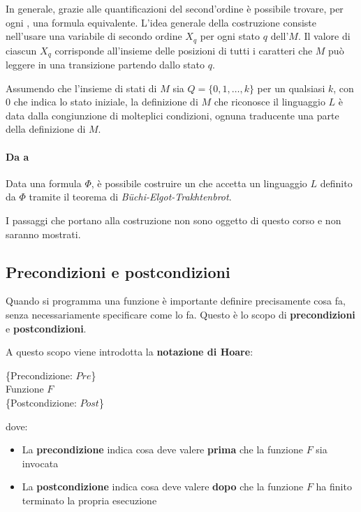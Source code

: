 \documentclass[italian, 10pt]{article}
\begin{document}
In generale, grazie alle quantificazioni del second'ordine è possibile trovare, per ogni \FSA, una formula \MSO equivalente.
L'idea generale della costruzione consiste nell'usare una variabile di secondo ordine \(X_q\) per ogni stato \(q\) dell'\FSA \(M\).
Il valore di ciascun \(X_q\) corrisponde all'insieme delle posizioni di tutti i caratteri che \(M\) può leggere in una transizione partendo dallo stato \(q\).

Assumendo che l'insieme di stati di \(M\) sia \(Q = \{0, 1, \ldots, k\}\) per un qualsiasi \(k\), con \(0\) che indica lo stato iniziale, la definizione di \(M\) che riconosce il linguaggio \(L\) è data dalla congiunzione di molteplici condizioni, ognuna traducente una parte della definizione di \(M\).

\paragraph{Da \MSO a \FSA}

Data una formula \MSO \(\Phi\), è possibile costruire un \FSA che accetta un linguaggio \(L\) definito da \(\Phi\) tramite il teorema di \textit{Büchi-Elgot-Trakhtenbrot}.

\bigskip
I passaggi che portano alla costruzione non sono oggetto di questo corso e non saranno mostrati.

\subsection{Precondizioni e postcondizioni}
\label{sec:precondizioni-postcondizioni}

Quando si programma una funzione è importante definire precisamente cosa fa, senza necessariamente specificare come lo fa.
Questo è lo scopo di \textbf{precondizioni} e \textbf{postcondizioni}.

\bigskip
A questo scopo viene introdotta la \textbf{notazione di Hoare}:

\begin{center}
  \{Precondizione: \(Pre\)\} \\
  Funzione \(F\) \\
  \{Postcondizione: \(Post\)\}
\end{center}

dove:
\begin{itemize}
  \item La \textbf{precondizione} indica cosa deve valere \textbf{prima} che la funzione \(F\) sia invocata
  \item La \textbf{postcondizione} indica cosa deve valere \textbf{dopo} che la funzione \(F\) ha finito terminato la propria esecuzione
\end{itemize}
\end{document}
